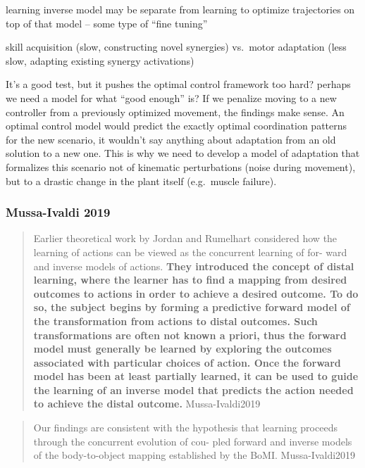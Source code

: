 \documentclass[../main.tex]{subfiles}
\begin{document}
learning inverse model may be separate from learning to optimize trajectories on top of that model -- some type of ``fine tuning''

skill acquisition (slow, constructing novel synergies) vs.~motor adaptation (less slow, adapting existing synergy activations)

It's a good test, but it pushes the optimal control framework too hard? perhaps we need a model for what ``good enough'' is? If we penalize moving to a new controller from a previously optimized movement, the findings make sense. An optimal control model would predict the exactly optimal coordination patterns for the new scenario, it wouldn't say anything about adaptation from an old solution to a new one. This is why we need to develop a model of adaptation that formalizes this scenario not of kinematic perturbations (noise during movement), but to a drastic change in the plant itself (e.g.~muscle failure).

\subsubsection{Mussa-Ivaldi 2019}\label{mussa-ivaldi-2019}

\begin{quote}
Earlier theoretical work by Jordan and Rumelhart \cite{14} considered how the learning of actions can be viewed as the concurrent learning of for- ward and inverse models of actions. \textbf{They introduced the concept of distal learning, where the learner has to find a mapping from desired outcomes to actions in order to achieve a desired outcome. To do so, the subject begins by forming a predictive forward model of the transformation from actions to distal outcomes. Such transformations are often not known a priori, thus the forward model must generally be learned by exploring the outcomes associated with particular choices of action. Once the forward model has been at least partially learned, it can be used to guide the learning of an inverse model that predicts the action needed to achieve the distal outcome.} Mussa-Ivaldi2019
\end{quote}

\begin{quote}
Our findings are consistent with the hypothesis that learning proceeds through the concurrent evolution of cou- pled forward and inverse models of the body-to-object mapping established by the BoMI. Mussa-Ivaldi2019
\end{quote}
\end{document}
